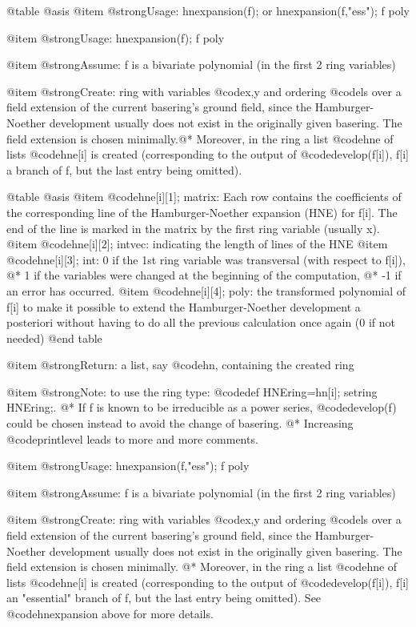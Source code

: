 @table @asis
@item @strong{Usage:}
hnexpansion(f); or hnexpansion(f,"ess"); f poly

@item @strong{Usage:}
hnexpansion(f); f poly

@item @strong{Assume:}
f is a bivariate polynomial (in the first 2 ring variables)

@item @strong{Create:}
ring with variables @code{x,y} and ordering @code{ls} over a
field extension of the current basering's ground field, 
since the Hamburger-Noether development usually does not exist
in the originally given basering. The field extension is chosen
minimally.@*
Moreover, in the ring a list @code{hne} of lists @code{hne[i]} is
created (corresponding to the output of @code{develop(f[i])},
f[i] a branch of f, but the last entry being omitted).

@table @asis
@item @code{hne[i][1]}; matrix:
         Each row contains the coefficients of the corresponding line of the
         Hamburger-Noether expansion (HNE) for f[i]. The end of the line is
         marked in the matrix by the first ring variable (usually x).
@item @code{hne[i][2]}; intvec:
         indicating the length of lines of the HNE
@item @code{hne[i][3]}; int:
         0  if the 1st ring variable was transversal (with respect to f[i]), @*
         1  if the variables were changed at the beginning of the
            computation, @*
        -1  if an error has occurred.
@item @code{hne[i][4]}; poly:
         the transformed polynomial of f[i] to make it possible to extend the
         Hamburger-Noether development a posteriori without having to do
         all the previous calculation once again (0 if not needed)
@end table

@item @strong{Return:}
a list, say @code{hn}, containing the created ring

@item @strong{Note:}
to use the ring type: @code{def HNEring=hn[i]; setring HNEring;}.
@*
If f is known to be irreducible as a power series, @code{develop(f)}
could be chosen instead to avoid the change of basering. @*
Increasing @code{printlevel} leads to more and more comments.

@item @strong{Usage:}
hnexpansion(f,"ess"); f poly

@item @strong{Assume:}
f is a bivariate polynomial (in the first 2 ring variables)

@item @strong{Create:}
ring with variables @code{x,y} and ordering @code{ls} over a
field extension of the current basering's ground field, 
since the Hamburger-Noether development usually does not exist
in the originally given basering. The field extension is chosen
minimally.
@*
Moreover, in the ring a list @code{hne} of lists @code{hne[i]} is
created (corresponding to the output of @code{develop(f[i])}, f[i] an
"essential" branch of f, but the last entry being omitted). See
@code{hnexpansion} above for more details.

